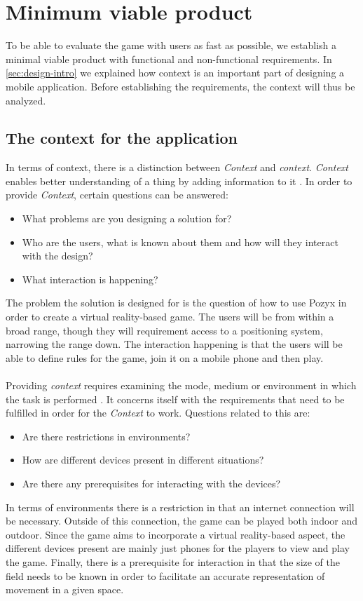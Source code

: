 \section{Minimum viable product}\label{sec:mvp}
To be able to evaluate the game with users as fast as possible, we establish a minimal viable product with functional and non-functional requirements.
In \autoref{sec:design-intro} we explained how context is an important part of designing a mobile application.
Before establishing the requirements, the context will thus be analyzed.

\subsection{The context for the application}\label{subsec:context}
In terms of context, there is a distinction between \textit{Context} and \textit{context}.
\textit{Context} enables better understanding of a thing by adding information to it \cite{MobileDesign}.
In order to provide \textit{Context}, certain questions can be answered:
\begin{itemize}
    \item What problems are you designing a solution for?
    \item Who are the users, what is known about them and how will they interact with the design?
    \item What interaction is happening?
\end{itemize}
The problem the solution is designed for is the question of how to use Pozyx in order to create a virtual reality-based game.
The users will be from within a broad range, though they will requirement access to a positioning system, narrowing the range down.
The interaction happening is that the users will be able to define rules for the game, join it on a mobile phone and then play.
\\\\
Providing \textit{context} requires examining the mode, medium or environment in which the task is performed \cite{MobileDesign}.
It concerns itself with the requirements that need to be fulfilled in order for the \textit{Context} to work.
Questions related to this are:
\begin{itemize}
    \item Are there restrictions in environments?
    \item How are different devices present in different situations?
    \item Are there any prerequisites for interacting with the devices?
\end{itemize}
In terms of environments there is a restriction in that an internet connection will be necessary.
Outside of this connection, the game can be played both indoor and outdoor.
Since the game aims to incorporate a virtual reality-based aspect, the different devices present are mainly just phones for the players to view and play the game.
Finally, there is a prerequisite for interaction in that the size of the field needs to be known in order to facilitate an accurate representation of movement in a given space.


